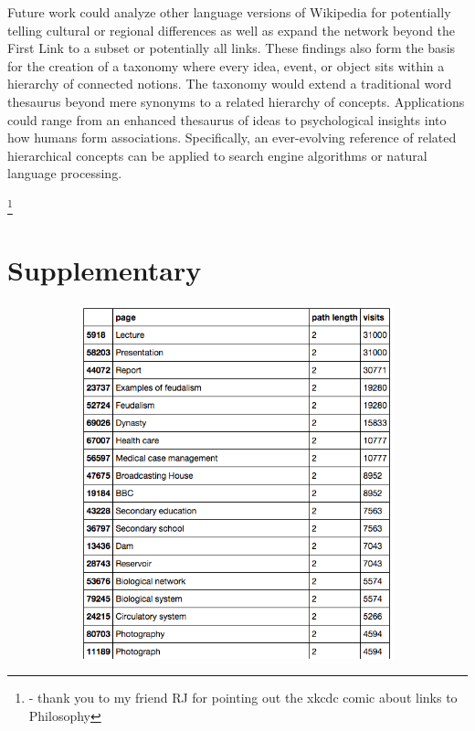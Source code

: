 \documentclass[twoside]{article}
\newcommand\blfootnote[1]{%
  \begingroup
    \renewcommand\thefootnote{}\footnote{#1}%
      \addtocounter{footnote}{-1}%
   \endgroup }
\begin{document}
Future work could analyze other language versions of Wikipedia for potentially telling cultural or regional differences as well as expand the network beyond the First Link to a subset or potentially all links.
These findings also form the basis for the creation of a taxonomy where 
every idea, event, or object sits within a hierarchy of connected notions.
The taxonomy would extend a traditional word thesaurus beyond mere synonyms to a related hierarchy of concepts.
Applications could range from an enhanced thesaurus of ideas to psychological insights into how humans form associations.
Specifically, an ever-evolving reference of related hierarchical concepts can be applied to search engine algorithms 
or natural language processing.



\blfootnote{
- thank you to my friend RJ for pointing out the xkcdc comic about links to Philosophy
}


\newpage 

\section{Supplementary}

\begin{figure}[H]
\centering
\caption{highest ranking 2-Cycles}
    \begin{subfigure}[b]{0.8\textwidth}
        \includegraphics[width=\textwidth]{graphics/top_2loops.png}
    \end{subfigure}
\end{figure}
\end{document}
